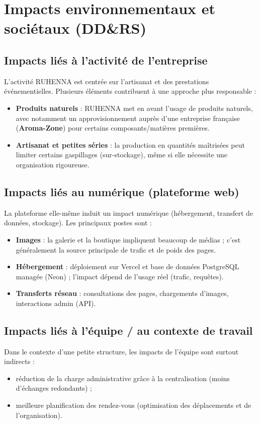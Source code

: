 \section{Impacts environnementaux et sociétaux (DD\&RS)}

\subsection{Impacts liés à l’activité de l’entreprise}
L’activité RUHENNA est centrée sur l’artisanat et des prestations événementielles. Plusieurs éléments contribuent à une approche plus responsable :
\begin{itemize}
    \item \textbf{Produits naturels} : RUHENNA met en avant l’usage de produits naturels, avec notamment un approvisionnement auprès d’une entreprise française (\textbf{Aroma-Zone}) pour certains composants/matières premières.
    \item \textbf{Artisanat et petites séries} : la production en quantités maîtrisées peut limiter certains gaspillages (sur-stockage), même si elle nécessite une organisation rigoureuse.
\end{itemize}

\subsection{Impacts liés au numérique (plateforme web)}
La plateforme elle-même induit un impact numérique (hébergement, transfert de données, stockage). Les principaux postes sont :
\begin{itemize}
    \item \textbf{Images} : la galerie et la boutique impliquent beaucoup de médias ; c’est généralement la source principale de trafic et de poids des pages.
    \item \textbf{Hébergement} : déploiement sur Vercel et base de données PostgreSQL managée (Neon) ; l’impact dépend de l’usage réel (trafic, requêtes).
    \item \textbf{Transferts réseau} : consultations des pages, chargements d’images, interactions admin (API).
\end{itemize}

\subsection{Impacts liés à l’équipe / au contexte de travail}
Dans le contexte d’une petite structure, les impacts de l’équipe sont surtout indirects :
\begin{itemize}
    \item réduction de la charge administrative grâce à la centralisation (moins d’échanges redondants) ;
    \item meilleure planification des rendez-vous (optimisation des déplacements et de l’organisation).
\end{itemize}

